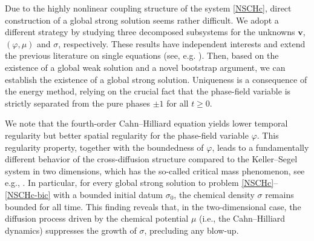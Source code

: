 \documentclass[11pt,reqno]{amsart}
\begin{document}
Due to the highly nonlinear coupling structure of the system \eqref{NSCHc}, direct construction of a global strong solution seems rather difficult. We adopt a different strategy by studying three decomposed subsystems for the unknowns $\bm{v}$, $(\varphi, \mu)$ and $\sigma$, respectively. These results have independent interests and extend the previous literature on single equations (see, e.g. \cite{CGGG,Gior2021}). Then, based on the existence of a global weak solution and a novel bootstrap argument, we can establish the existence of a global strong solution. Uniqueness is a consequence of the energy method, relying on the crucial fact that the phase-field variable is strictly separated from the pure phases $\pm 1$ for all $t\geq 0$.

We note that the fourth-order Cahn--Hilliard equation yields lower temporal regularity but better spatial regularity for the phase-field variable $\varphi$. This regularity property, together with the boundedness of $\varphi$, leads to a fundamentally different behavior of the cross-diffusion structure compared to the Keller--Segel system in two dimensions, which has the so-called critical mass phenomenon, see e.g., \cite{GZ98,HorW01,NSY97}. In particular, for every global strong solution to problem \eqref{NSCHc}--\eqref{NSCHc-bic} with a bounded initial datum $\sigma_0$, the chemical density $\sigma$ remains bounded for all time. This finding reveals that, in the two-dimensional case, the diffusion process driven by the chemical potential $\mu$ (i.e., the Cahn--Hilliard dynamics) suppresses the growth of $\sigma$, precluding any blow-up.

\end{document}
